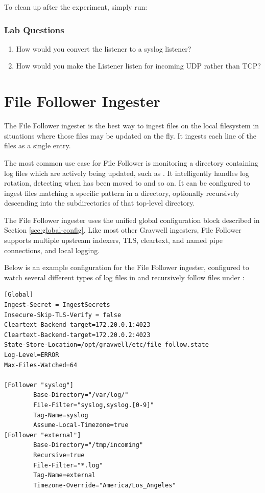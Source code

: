 To clean up after the experiment, simply run:


\subsubsection{Lab Questions}

\begin{enumerate}
\item
  How would you convert the listener to a syslog listener?
\item
  How would you make the Listener listen for incoming UDP rather than
  TCP?
\end{enumerate}

\section{File Follower Ingester}

The File Follower ingester is the best way to ingest files on the local
filesystem in situations where those files may be updated on the fly. It
ingests each line of the files as a single entry.

The most common use case for File Follower is monitoring a directory
containing log files which are actively being updated, such
as . It intelligently handles log rotation, detecting when
 has been moved to  and so on. It can be configured to
ingest files matching a specific pattern in a directory, optionally
recursively descending into the subdirectories of that top-level
directory.

The File Follower ingester uses the unified global configuration block
described in Section \ref{sec:global-config}. Like most other Gravwell ingesters,
File Follower supports multiple upstream indexers, TLS, cleartext, and
named pipe connections, and local logging.

Below is an example configuration for the File Follower ingester,
configured to watch several different types of log files in
 and recursively follow files under :

\begin{Verbatim}[breaklines=true]
[Global]
Ingest-Secret = IngestSecrets
Insecure-Skip-TLS-Verify = false
Cleartext-Backend-target=172.20.0.1:4023
Cleartext-Backend-target=172.20.0.2:4023
State-Store-Location=/opt/gravwell/etc/file_follow.state
Log-Level=ERROR
Max-Files-Watched=64

[Follower "syslog"]
        Base-Directory="/var/log/"
        File-Filter="syslog,syslog.[0-9]" 
        Tag-Name=syslog
        Assume-Local-Timezone=true
[Follower "external"]
        Base-Directory="/tmp/incoming"
        Recursive=true
        File-Filter="*.log"
        Tag-Name=external
        Timezone-Override="America/Los_Angeles"
\end{Verbatim}

